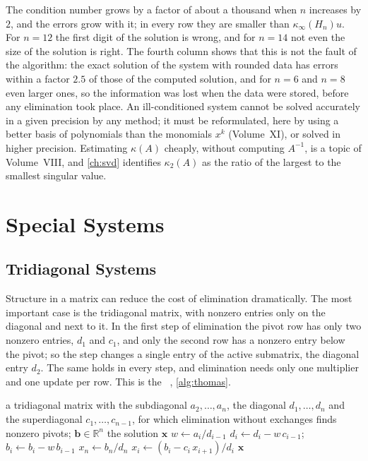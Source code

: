The condition number grows by a factor of about a thousand when $n$ increases by $2$, and the errors grow with it; in every row they are smaller than $\kappa_\infty(H_n)u$. For $n=12$ the first digit of the solution is wrong, and for $n=14$ not even the size of the solution is right. The fourth column shows that this is not the fault of the algorithm: the exact solution of the system with rounded data has errors within a factor $2.5$ of those of the computed solution, and for $n=6$ and $n=8$ even larger ones, so the information was lost when the data were stored, before any elimination took place. An ill-conditioned system cannot be solved accurately in a given precision by any method; it must be reformulated, here by using a better basis of polynomials than the monomials $x^k$ (Volume~XI), or solved in higher precision. Estimating $\kappa(A)$ cheaply, without computing $A^{-1}$, is a topic of Volume~VIII, and \cref{ch:svd} identifies $\kappa_2(A)$ as the ratio of the largest to the smallest singular value.

\section{Special Systems}
\label{sec:special-systems}

\subsection{Tridiagonal Systems}

Structure in a matrix can reduce the cost of elimination dramatically. The most important case is the tridiagonal matrix, with nonzero entries only on the diagonal and next to it. In the first step of elimination the pivot row has only two nonzero entries, $d_1$ and $c_1$, and only the second row has a nonzero entry below the pivot; so the step changes a single entry of the active submatrix, the diagonal entry $d_2$. The same holds in every step, and elimination needs only one multiplier and one update per row. This is the ~\cite{thomas1949}, \cref{alg:thomas}.

\begin{algorithm}
\begin{algorithmic}[1]
\Require a tridiagonal matrix with the subdiagonal $a_2,\ldots,a_n$, the diagonal $d_1,\ldots,d_n$ and the superdiagonal $c_1,\ldots,c_{n-1}$, for which elimination without exchanges finds nonzero pivots; $\mathbf b\in\mathbb R^n$
\Ensure the solution $\mathbf x$
  \State $w\gets a_i/d_{i-1}$ 
  \State $d_i\gets d_i-w\,c_{i-1}$; \ $b_i\gets b_i-w\,b_{i-1}$
\EndFor
\State $x_n\gets b_n/d_n$
  \State $x_i\gets(b_i-c_i\,x_{i+1})/d_i$
\EndFor
\State \Return $\mathbf x$
\end{algorithmic}
\caption{Gaussian elimination and back substitution for a tridiagonal system (the Thomas algorithm). The first loop uses five operations per row and the second three, $8n-7$ operations in all; the storage is four vectors of length $n$.}
\label{alg:thomas}
\end{algorithm}

